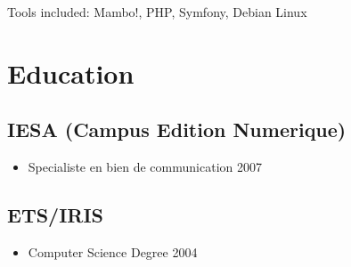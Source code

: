 \documentclass{article}
\begin{document}
Tools included: Mambo!, PHP, Symfony, Debian Linux

\section*{Education}
\subsection*{IESA (Campus Edition Numerique)}
\begin{itemize}
\item Specialiste en bien de communication 2007
\end{itemize}
\subsection*{ETS/IRIS}
\begin{itemize}
\item Computer Science Degree 2004
\end{itemize}
\end{document}
